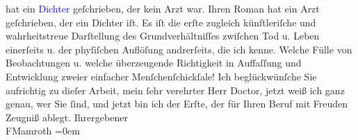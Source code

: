                     hat ein \textcolor{blue}{Dichter}{} geſchrieben, der kein Arzt
                    war. Ihren Roman hat ein Arzt geſchrieben, der ein Dichter iſt. Es iſt die erſte
                    zugleich künſtleriſche und wahrheitstreue Darſtellung des Grundverhältniſſes
                    zwiſchen Tod u. Leben einerſeits u. der phyſiſchen Auflöſung andrerſeits, die
                    ich kenne. Welche Fülle von Beobachtungen u. welche überzeugende Richtigkeit in
                    Auffaſſung und Entwicklung zweier einfacher Menſchenſchickſale! Ich
                    beglückwünſche Sie aufrichtig zu dieſer Arbeit, mein ſehr verehrter Herr Doctor,
                    jetzt weiß ich ganz genau, wer Sie ſind, und jetzt bin ich der Erſte, der für
                    Ihren Beruf mit Freuden Zeugniß ablegt.\pend
           \pstart
           Ihr\hspace*{1.5em}ergebener{\\[\baselineskip]}\spacefill\mbox{FMamroth}\pend
           \leftskip=0em{}\endnumbering{}  
      